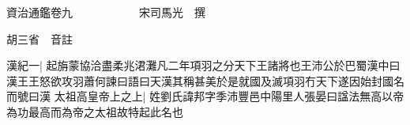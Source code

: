 






























































資治通鑑卷九　　　　　　宋司馬光　撰

胡三省　音註

漢紀一|{
	起旃蒙協洽盡柔兆涒灘凡二年項羽之分天下王諸將也王沛公於巴蜀漢中曰漢王王怒欲攻羽蕭何諫曰語曰天漢其稱甚美於是就國及滅項羽冇天下遂因始封國名而號曰漢}
太祖高皇帝上之上|{
	姓劉氏諱邦字季沛豐邑中陽里人張晏曰諡法無高以帝為功最高而為帝之太祖故特起此名也}


